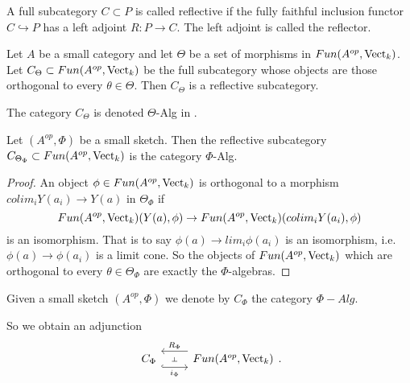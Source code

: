\begin{definition}
  \noindent A full subcategory $C\subset P$ is called reflective if the fully
  faithful inclusion functor $C\hookrightarrow P$ has a left adjoint $R:P\to
  C$. The left adjoint is called the reflector.
\end{definition}

\begin{theorem}\cite[theorem 6.5]{kelly/basic-concepts-enriched}\label{reflective}

  \noindent Let $A$ be a small category and let $\Theta$ be a set of morphisms
  in $Fun(A^{op},\operatorname{Vect}_k)$. Let $C_{\Theta}\subset Fun(A^{op},\operatorname{Vect}_k)$ be the
  full subcategory whose objects are those orthogonal to every
  $\theta\in\Theta$. Then $C_{\Theta}$ is a reflective subcategory.
\end{theorem}

\begin{remark}
  The category $C_{\Theta}$ is denoted $\Theta$-Alg in
  \cite{kelly/basic-concepts-enriched}.
\end{remark}


\begin{lemma}\cite[theorem 6.11]{kelly/basic-concepts-enriched}
  Let $(A^{op},\Phi)$ be a small sketch. Then the reflective subcategory
  $C_{\Theta_{\Phi}}\subset Fun(A^{op},\operatorname{Vect}_k)$ is the category $\Phi$-Alg.
\end{lemma}

\begin{proof}
  An object $\phi \in Fun(A^{op},\operatorname{Vect}_k)$ is orthogonal to a morphism
  $colim_i Y(a_i)\to Y(a)$ in $\Theta_{\Phi}$
  if $$Fun(A^{op},\operatorname{Vect}_k)(Y(a),\phi)\to Fun(A^{op},\operatorname{Vect}_k)(colim_i
  Y(a_i),\phi)$$ is an isomorphism. That is to say $\phi(a)\to lim_i
  \phi(a_i)$ is an isomorphism, i.e. $\phi(a)\to \phi(a_i)$ is a limit cone.
  So the objects of $Fun(A^{op},\operatorname{Vect}_k)$ which are orthogonal to every
  $\theta\in \Theta_{\Phi}$ are exactly the $\Phi$-algebras.
\end{proof}

\begin{definition}

  \noindent Given a small sketch $(A^{op},\Phi)$ we denote by $C_{\Phi}$ the
  category $\Phi-Alg$.
\end{definition}


So we obtain an adjunction
\[\begin{tikzcd}
            {C_{\Phi}} & {Fun(A^{op},\Vect_k)}
            \arrow[""{name=0, anchor=center, inner sep=0}, "i_{\Phi}"', shift right=3, hook, from=1-1, to=1-2]
            \arrow[""{name=1, anchor=center, inner sep=0}, "R_{\Phi}"', shift right=3, from=1-2, to=1-1]
            \arrow["\dashv"{anchor=center, rotate=-90}, draw=none, from=1, to=0]
\end{tikzcd}.
\]

